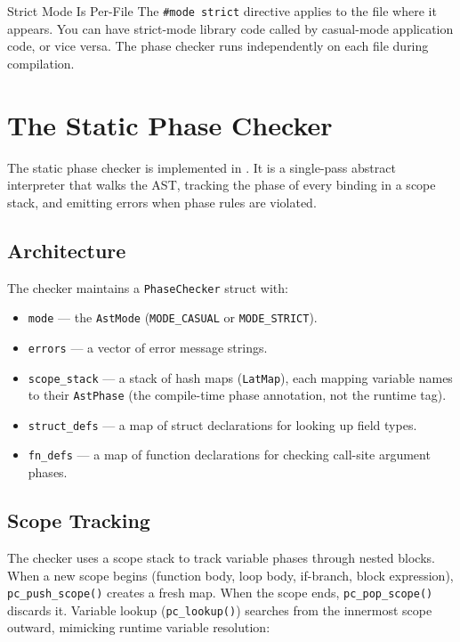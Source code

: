 \begin{notebox}{Strict Mode Is Per-File}
The \lstinline|#mode strict| directive applies to the file where it appears.
You can have strict-mode library code called by casual-mode application code, or vice versa.
The phase checker runs independently on each file during compilation.
\end{notebox}

\section{The Static Phase Checker}\label{sec:static-phase-checker}


The static phase checker is implemented in .
It is a single-pass abstract interpreter that walks the AST, tracking the phase of every binding in a scope stack, and emitting errors when phase rules are violated.

\subsection{Architecture}

The checker maintains a \lstinline|PhaseChecker| struct with:

\begin{itemize}
  \item \lstinline|mode| --- the \lstinline|AstMode| (\lstinline|MODE_CASUAL| or \lstinline|MODE_STRICT|).
  \item \lstinline|errors| --- a vector of error message strings.
  \item \lstinline|scope_stack| --- a stack of hash maps (\lstinline|LatMap|), each mapping variable names to their \lstinline|AstPhase| (the compile-time phase annotation, not the runtime tag).
  \item \lstinline|struct_defs| --- a map of struct declarations for looking up field types.
  \item \lstinline|fn_defs| --- a map of function declarations for checking call-site argument phases.
\end{itemize}

\subsection{Scope Tracking}

The checker uses a scope stack to track variable phases through nested blocks.
When a new scope begins (function body, loop body, if-branch, block expression), \lstinline|pc_push_scope()| creates a fresh map.
When the scope ends, \lstinline|pc_pop_scope()| discards it.
Variable lookup (\lstinline|pc_lookup()|) searches from the innermost scope outward, mimicking runtime variable resolution:

